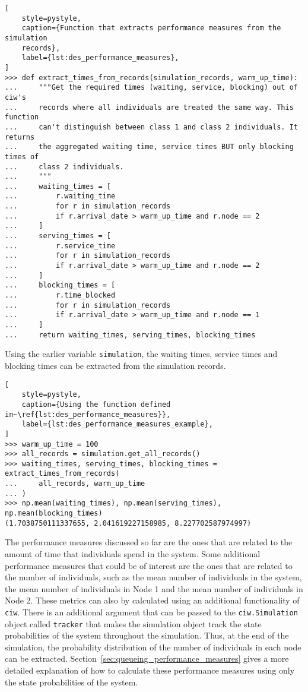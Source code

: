 \begin{lstlisting}[
    style=pystyle,
    caption={Function that extracts performance measures from the simulation
    records},
    label={lst:des_performance_measures},
]
>>> def extract_times_from_records(simulation_records, warm_up_time):
...     """Get the required times (waiting, service, blocking) out of ciw's
...     records where all individuals are treated the same way. This function
...     can't distinguish between class 1 and class 2 individuals. It returns
...     the aggregated waiting time, service times BUT only blocking times of
...     class 2 individuals.
...     """
...     waiting_times = [
...         r.waiting_time
...         for r in simulation_records
...         if r.arrival_date > warm_up_time and r.node == 2
...     ]
...     serving_times = [
...         r.service_time
...         for r in simulation_records
...         if r.arrival_date > warm_up_time and r.node == 2
...     ]
...     blocking_times = [
...         r.time_blocked
...         for r in simulation_records
...         if r.arrival_date > warm_up_time and r.node == 1
...     ]
...     return waiting_times, serving_times, blocking_times

\end{lstlisting}

Using the earlier variable \texttt{simulation}, the waiting
times, service times and blocking times can be extracted from the simulation
records.

\begin{lstlisting}[
    style=pystyle,
    caption={Using the function defined in~\ref{lst:des_performance_measures}},
    label={lst:des_performance_measures_example},
]
>>> warm_up_time = 100
>>> all_records = simulation.get_all_records()
>>> waiting_times, serving_times, blocking_times = extract_times_from_records(
...     all_records, warm_up_time
... )
>>> np.mean(waiting_times), np.mean(serving_times), np.mean(blocking_times)
(1.7038750111337655, 2.041619227158985, 8.227702587974997)

\end{lstlisting}

The performance measures discussed so far are the ones that are related to the
amount of time that individuals spend in the system.
Some additional performance measures that could be of interest are the
ones that are related to the number of individuals, such as the mean number of
individuals in the system, the mean number of individuals in Node 1 and the
mean number of individuals in Node 2.
These metrics can also by calculated using an additional functionality of
\texttt{ciw}.
There is an additional argument that can be passed to the
\texttt{ciw.Simulation} object called \texttt{tracker} that makes the
simulation object track the state probabilities of the system throughout the
simulation.
Thus, at the end of the simulation, the probability distribution of the number
of individuals in each node can be extracted.
Section~\ref{sec:queueing_performance_measures} gives a more detailed
explanation of how to calculate these performance measures using only the
state probabilities of the system.
